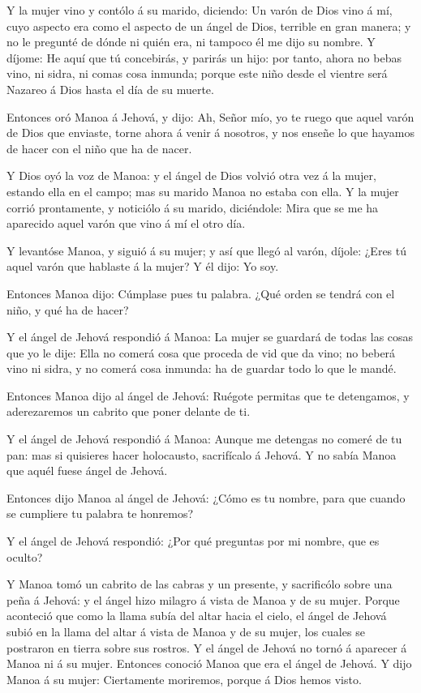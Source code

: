  Y la mujer vino y contólo á su marido, diciendo: Un varón
de Dios vino á mí, cuyo aspecto era como el aspecto de un ángel de Dios,
terrible en gran manera; y no le pregunté de dónde ni quién era, ni
tampoco él me dijo su nombre.  Y díjome: He aquí que tú
concebirás, y parirás un hijo: por tanto, ahora no bebas vino, ni sidra,
ni comas cosa inmunda; porque este niño desde el vientre será Nazareo á
Dios hasta el día de su muerte.

 Entonces oró Manoa á Jehová, y dijo: Ah, Señor mío, yo te
ruego que aquel varón de Dios que enviaste, torne ahora á venir á
nosotros, y nos enseñe lo que hayamos de hacer con el niño que ha de
nacer.

 Y Dios oyó la voz de Manoa: y el ángel de Dios volvió otra
vez á la mujer, estando ella en el campo; mas su marido Manoa no estaba
con ella.  Y la mujer corrió prontamente, y noticiólo á su
marido, diciéndole: Mira que se me ha aparecido aquel varón que vino á
mí el otro día.

 Y levantóse Manoa, y siguió á su mujer; y así que llegó al
varón, díjole: ¿Eres tú aquel varón que hablaste á la mujer? Y él dijo:
Yo soy.

 Entonces Manoa dijo: Cúmplase pues tu palabra. ¿Qué orden
se tendrá con el niño, y qué ha de hacer?

 Y el ángel de Jehová respondió á Manoa: La mujer se
guardará de todas las cosas que yo le dije:  Ella no comerá
cosa que proceda de vid que da vino; no beberá vino ni sidra, y no
comerá cosa inmunda: ha de guardar todo lo que le mandé.

 Entonces Manoa dijo al ángel de Jehová: Ruégote permitas
que te detengamos, y aderezaremos un cabrito que poner delante de ti.

 Y el ángel de Jehová respondió á Manoa: Aunque me detengas
no comeré de tu pan: mas si quisieres hacer holocausto, sacrifícalo á
Jehová. Y no sabía Manoa que aquél fuese ángel de Jehová.

 Entonces dijo Manoa al ángel de Jehová: ¿Cómo es tu
nombre, para que cuando se cumpliere tu palabra te honremos?

 Y el ángel de Jehová respondió: ¿Por qué preguntas por mi
nombre, que es oculto?

 Y Manoa tomó un cabrito de las cabras y un presente, y
sacrificólo sobre una peña á Jehová: y el ángel hizo milagro á vista de
Manoa y de su mujer.  Porque aconteció que como la llama
subía del altar hacia el cielo, el ángel de Jehová subió en la llama del
altar á vista de Manoa y de su mujer, los cuales se postraron en tierra
sobre sus rostros.  Y el ángel de Jehová no tornó á
aparecer á Manoa ni á su mujer. Entonces conoció Manoa que era el ángel
de Jehová.  Y dijo Manoa á su mujer: Ciertamente moriremos,
porque á Dios hemos visto.

